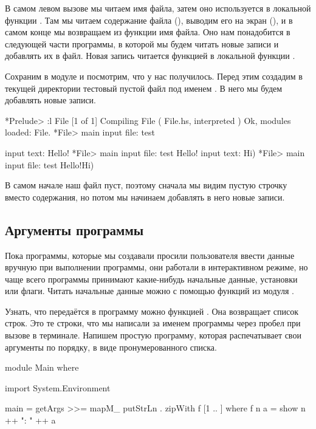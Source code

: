 В самом левом вызове  мы читаем имя файла, затем
оно используется в локальной функции . Там мы читаем
содержание файла (), выводим его на экран (),
и в самом конце мы возвращаем из функции имя файла. Оно нам понадобится
в следующей части программы, в которой мы будем читать новые записи
и добавлять их в файл. Новая запись читается функцией 
в локальной функции .

Сохраним в модуле  и посмотрим, что у нас получилось.
Перед этим создадим в текущей директории тестовый
пустой файл под именем . В него мы будем добавлять новые
записи. 

\begin{code}
*Prelude> :l File
[1 of 1] Compiling File             ( File.hs, interpreted )
Ok, modules loaded: File.
*File> main
input file: test

input text: Hello!
*File> main
input file: test
Hello!
input text: Hi)
*File> main
input file: test
Hello!Hi)
\end{code}

В самом начале наш файл пуст, поэтому сначала мы видим
пустую строчку вместо содержания, но потом мы начинаем добавлять
в него новые записи.

\subsection{Аргументы программы}

Пока программы, которые мы создавали просили пользователя 
ввести данные вручную при выполнении программы,
они работали в интерактивном режиме, но чаще всего программы
принимают какие-нибудь начальные данные, установки или флаги. 
Читать начальные данные можно с помощью функций из модуля 
. 

Узнать, что передаётся в программу можно функцией 
. Она возвращает список строк. Это те строки, что
мы написали за именем программы через пробел при вызове в терминале.
Напишем простую программу, которая распечатывает свои аргументы
по порядку, в виде пронумерованного списка.

\begin{code}
module Main where

import System.Environment

main = getArgs >>= mapM_ putStrLn . zipWith f [1 .. ]
    where f n a = show n ++ ": " ++ a
\end{code}

